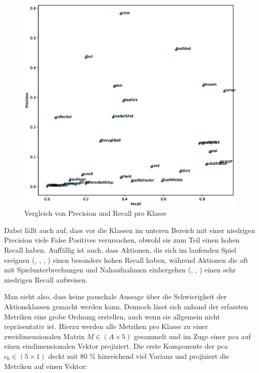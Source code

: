 \begin{figure}
    \centering
    \includegraphics[width=0.99\textwidth, keepaspectratio, interpolate]{img/07_precision_recall_by_class.eps}
    \caption{Vergleich von Precision und Recall pro Klasse}
    \label{fig:precision-recall}
\end{figure}

Dabei fällt auch auf, dass vor die Klassen im unteren Bereich mit einer niedrigen Precision viele False Positives verursachen, obwohl sie zum Teil einen hohen Recall haben.
Auffällig ist auch, dass Aktionen, die sich im laufenden Spiel ereignen (, , , ) einen besonders hohen Recall haben, während Aktionen die oft mit Spielunterbrechungen und Nahaufnahmen einhergehen (, , ) einen sehr niedrigen Recall aufweisen.

Man sieht also, dass keine pauschale Aussage über die Schwierigkeit der Aktionsklassen gemacht werden kann.
Dennoch lässt sich anhand der erfassten Metriken eine grobe Ordnung erstellen, auch wenn sie allgemein nicht repräsentativ ist.
Hierzu werden alle Metriken pro Klasse zu einer zweidimensionalen Matrix $M \in (A \times 5)$ gesammelt und im Zuge einer \gls{pca} auf einen eindimensionalen Vektor projiziert.
Die erste Komponente der \gls{pca} $c_0 \in (5 \times 1)$ deckt mit 80 \% hinreichend viel Varianz und projiziert die Metriken auf einen Vektor:

